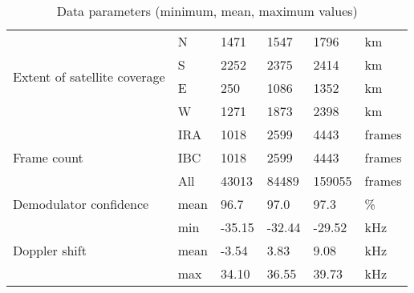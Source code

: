 \begin{table}
\begin{tabular}{p{1in}l|llll}
\multirow{4}{1in}{Extent of satellite coverage} &  N     & 1471 & 1547 & 1796 & km     \\ 
                                            &  S     & 2252 & 2375 & 2414 & km     \\ 
                                            &  E     & 250  & 1086 & 1352  & km     \\ 
                                            &  W     & 1271 & 1873 & 2398 & km     \\  \hline
\multirow{3}{1in}{Frame count}                  &  IRA   & 1018 & 2599 & 4443 &     frames \\ 
                                            &  IBC   & 1018 & 2599 & 4443 &     frames \\ 
                                            &  All   & 43013 & 84489 & 159055 & frames     \\  \hline
Demodulator confidence                      &  mean  & 96.7 & 97.0 & 97.3 &  \%    \\ \hline
\multirow{3}{1in}{Doppler shift}            &  min   & -35.15 & -32.44 & -29.52 & kHz \\
                                            &  mean  & -3.54 & 3.83 & 9.08 &      kHz \\
                                            &  max   & 34.10 & 36.55 & 39.73 &    kHz \\
    \end{tabular}
    \caption{Data parameters (minimum, mean, maximum values)}
    \label{t_exp_data_param}
\end{table}
